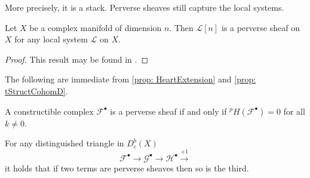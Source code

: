  More precisely, it is a stack.
  Perverse sheaves still capture the local systems.
  \begin{theorem}
    Let $X$ be a complex manifold of dimension $n$. Then $\mathcal{L}[n]$ is a perverse sheaf on $X$ for any local system $\mathcal{L}$ on $X$.
  \end{theorem}
  \begin{proof}
    This result may be found in \cite[Chapter 5]{dimca2004sheaves}.
  \end{proof}
  The following are immediate from \cref{prop: HeartExtension} and \cref{prop: tStructCohomD}.
  \begin{proposition}
    A constructible complex $\mathcal{F}^\bullet$ is a perverse sheaf if and only if $^pH(\mathcal{F}^\bullet) = 0$ for all $k\neq 0$.
  \end{proposition}
  \begin{proposition}
    For any distinguished triangle in $D_c^b(X)$
    $$\mathcal{F}^\bullet \to \mathcal{G}^\bullet \to \mathcal{H}^\bullet \xrightarrow{+1} $$
    it holds that if two terms are perverse sheaves then so is the third.
  \end{proposition}
